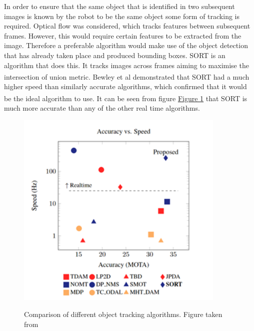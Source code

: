 \documentclass[11pt]{article}		%
\newcommand{\supercite}[1]{\textsuperscript{\cite{#1}}}		%
\begin{document}
	        In order to ensure that the same object that is identified in two subsequent images is known by the robot to be the same object some form of tracking is required. 
	        Optical flow was considered, which tracks features between subsequent frames.
	        However, this would require certain features to be extracted from the image. 
	        Therefore a preferable algorithm would make use of the object detection that has already taken place and produced bounding boxes. 
	        SORT is an algorithm that does this. 
	        It tracks images across frames aiming to maximise the intersection of union metric. 
	        Bewley et al \supercite{object_tracking} demonstrated that SORT had a much higher speed than similarly accurate algorithms, which confirmed that it would be the ideal algorithm to use.\supercite{object_tracking} It can be seen from figure \hyperref[object_tracking_comp]{Figure \ref*{object_tracking_comp}} that SORT is much more accurate than any of the other real time algorithms.
         	\begin{figure}[h]
				\centering
				\includegraphics[width=10cm] {comparison_object_tracking.png}
				\caption{Comparison of different object tracking algorithms. Figure taken from} \cite{object_tracking}
				\label{object_tracking_comp}
			\end{figure}
			
\end{document}
